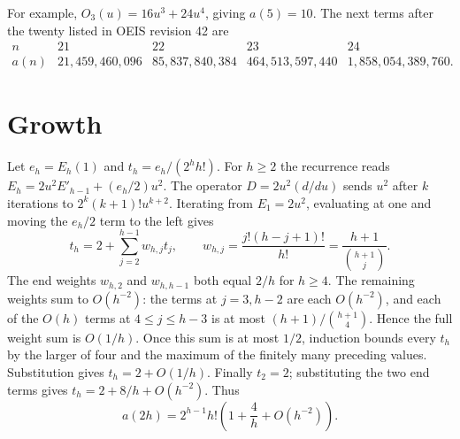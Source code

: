 \documentclass[11pt,letterpaper]{article}
\begin{document}
For example, $O_3(u)=16u^3+24u^4$, giving $a(5)=10$. The next terms after the twenty listed in OEIS revision 42 are
\[
\begin{array}{c|rrrr}
n&21&22&23&24\\\hline
a(n)&21{,}459{,}460{,}096&85{,}837{,}840{,}384&464{,}513{,}597{,}440&1{,}858{,}054{,}389{,}760 .
\end{array}
\]

\section*{Growth}
Let $e_h=E_h(1)$ and $t_h=e_h/(2^h h!)$. For $h\ge2$ the recurrence reads
$E_h=2u^2 E'_{h-1}+(e_h/2)u^2$. The operator $D=2u^2(d/du)$ sends $u^2$ after $k$ iterations to $2^k(k+1)!u^{k+2}$. Iterating from $E_1=2u^2$, evaluating at one and moving the $e_h/2$ term to the left gives
\[
 t_h=2+\sum_{j=2}^{h-1}w_{h,j}t_j,\qquad
 w_{h,j}=\frac{j!(h-j+1)!}{h!}=\frac{h+1}{\binom{h+1}{j}} .
\]
The end weights $w_{h,2}$ and $w_{h,h-1}$ both equal $2/h$ for $h\ge4$. The remaining weights sum to $O(h^{-2})$: the terms at $j=3,h-2$ are each $O(h^{-2})$, and each of the $O(h)$ terms at $4\le j\le h-3$ is at most $(h+1)/\binom{h+1}{4}$. Hence the full weight sum is $O(1/h)$. Once this sum is at most $1/2$, induction bounds every $t_h$ by the larger of four and the maximum of the finitely many preceding values. Substitution gives $t_h=2+O(1/h)$. Finally $t_2=2$; substituting the two end terms gives $t_h=2+8/h+O(h^{-2})$. Thus
\[
 \boxed{\displaystyle a(2h)=2^{h-1}h!\left(1+\frac4h+O(h^{-2})\right).}
\]
\end{document}
